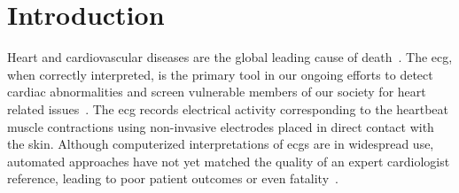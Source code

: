 \documentclass[\main/thesis.tex]{subfiles}
\begin{document}
\chapter{Introduction}

Heart and cardiovascular diseases are the global leading cause of death~\cite{doi:10.1161/CIR.0000000000000757}.
The \gls{ecg}, when correctly interpreted, is the primary tool in our ongoing efforts to detect cardiac abnormalities and screen vulnerable members of our society for heart related issues~\cite{SMULYAN2019153}.
The \gls{ecg} records electrical activity corresponding to the heartbeat muscle contractions using non-invasive electrodes placed in direct contact with the skin.
Although computerized interpretations of \gls{ecg}s are in widespread use, automated approaches have not yet matched the quality of an expert cardiologist reference, leading to poor patient outcomes or even fatality~\cite{BREEN2019}.










\end{document}

